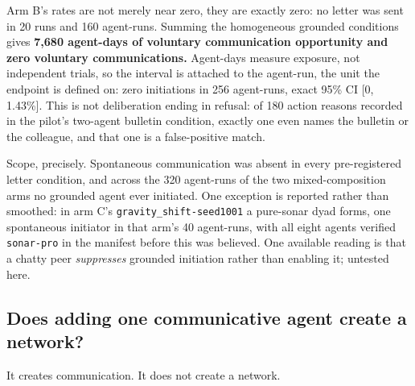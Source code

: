 \documentclass[pdflatex,sn-basic]{sn-jnl}
\begin{document}
Arm B's rates are not merely near zero, they are exactly zero: no letter was sent in 20 runs and
160 agent-runs. Summing the homogeneous grounded conditions gives \textbf{7,680 agent-days of
voluntary communication opportunity and zero voluntary communications.} Agent-days measure exposure, not independent trials, so the interval is attached to the
agent-run, the unit the endpoint is defined on:
zero initiations in 256 agent-runs, exact 95\% CI {[}0, 1.43\%{]}. This is not deliberation ending
in refusal: of 180 action reasons recorded in the pilot's two-agent bulletin condition, exactly one even names the bulletin or the colleague, and that one is a false-positive
match.

Scope, precisely. Spontaneous communication was absent in every pre-registered letter
condition, and across the 320 agent-runs of the two mixed-composition arms no grounded
agent ever initiated. One exception is reported rather than smoothed: in arm C's
\texttt{gravity\_shift-seed1001} a pure-sonar dyad forms, one spontaneous initiator in that arm's
40 agent-runs, with all eight agents verified \texttt{sonar-pro} in the manifest before this was
believed. One available reading is that a chatty peer \emph{suppresses} grounded initiation
rather than enabling it; untested here.

\hypertarget{does-adding-one-communicative-agent-create-a-network}{%
\subsection{Does adding one communicative agent create a network?}\label{does-adding-one-communicative-agent-create-a-network}}

It creates communication. It does not create a network.
\end{document}
